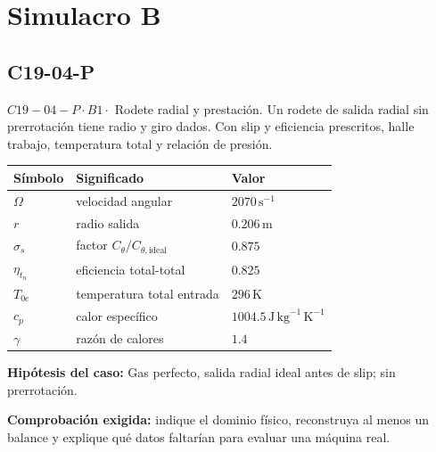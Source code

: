 \documentclass[10pt,openany]{book}
\begin{document}
\chapter{Simulacro B}
\section{C19-04-P}
\(C19-04-P \cdot B1 \cdot\) Rodete radial y prestación. Un rodete de salida radial sin prerrotación tiene radio y giro dados. Con slip y eficiencia prescritos, halle trabajo, temperatura total y relación de presión.
\begin{center}\begin{tabular}{p{.15\linewidth}p{.42\linewidth}p{.31\linewidth}}\textbf{Símbolo} & \textbf{Significado} & \textbf{Valor}\\\hline
\(\Omega\) & velocidad angular & \(2070\,\mathrm{s}^{-1}\)\\
\(r\) & radio salida & \(0.206\,\mathrm{m}\)\\
\(\sigma_s\) & factor $C_\theta/C_{\theta,\mathrm{ideal}}$ & \(0.875\)\\
\(\eta_{t_n}\) & eficiencia total-total & \(0.825\)\\
\(T_{0e}\) & temperatura total entrada & \(296\,\mathrm{K}\)\\
\(c_p\) & calor específico & \(1004.5\,\mathrm{J}\,\mathrm{kg}^{-1}\,\mathrm{K}^{-1}\)\\
\(\gamma\) & razón de calores & \(1.4\)\\
\end{tabular}\end{center}
\noindent\textbf{Hipótesis del caso:} Gas perfecto, salida radial ideal antes de slip; sin prerrotación.\par
\noindent\textbf{Comprobación exigida:} indique el dominio físico, reconstruya al menos un balance y explique qué datos faltarían para evaluar una máquina real.\par
\begin{center}\end{center}
\clearpage
\end{document}
